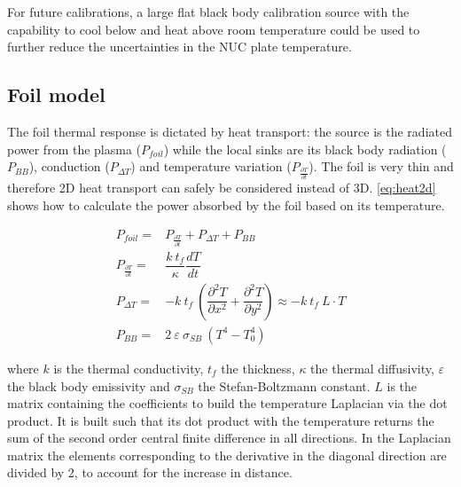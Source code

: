 For future calibrations, a large flat black body calibration source with the capability to cool below and heat above room temperature could be used to further reduce the uncertainties in the NUC plate temperature. 

\subsection{Foil model}\label{Foil model}
The foil thermal response is dictated by heat transport: the source is the radiated power from the plasma ($P_{foil}$) while the local sinks are its black body radiation ($P_{BB}$), conduction ($P_{\Delta T}$) and temperature variation ($P_{\frac {\partial T} {\partial t}}$). The foil is very thin and therefore 2D heat transport can safely be considered instead of 3D. \autoref{eq:heat2d} shows how to calculate the power absorbed by the foil based on its temperature.

\begin{equation}
\label{eq:heat2d}
\begin{aligned}
P_{foil}=& P_{\frac {\partial T} {\partial t}}+P_{\Delta T}+P_{BB}\\
P_{\frac {\partial T} {\partial t}}=& \dfrac{k \: t_f}{\kappa} \dfrac{dT}{dt} \\
 P_{\Delta T} =& -k \: t_f \:  \left( \dfrac{\partial^2 T}{\partial x^2} + \dfrac{\partial^2 T}{\partial y^2} \right) \approx -k \: t_f \: L \cdot T \\ P_{BB} =& 2 \: \varepsilon \: \sigma_{SB} \: (T^4 - T_0^4)
\end{aligned}
\end{equation}

where $k$ is the thermal conductivity, $t_f$ the thickness, $\kappa$ the thermal diffusivity, $\varepsilon$ the black body emissivity and $\sigma_{SB}$ the Stefan-Boltzmann constant. $L$ is the matrix containing the coefficients to build the temperature Laplacian via the dot product. It is built such that its dot product with the temperature returns the sum of the second order central finite difference in all directions. In the Laplacian matrix the elements corresponding to the derivative in the diagonal direction are divided by 2, to account for the increase in distance.

